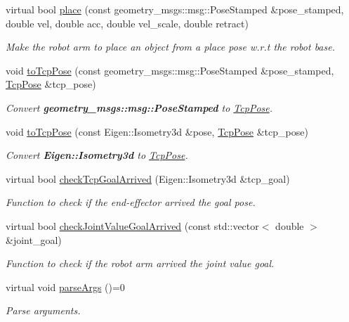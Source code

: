\begin{DoxyCompactItemize}
virtual bool \hyperlink{classArmControlBase_a3bb794da7b45bce3e2e16b3cecb21379}{place} (const geometry\+\_\+msgs\+::msg\+::\+Pose\+Stamped \&pose\+\_\+stamped, double vel, double acc, double vel\+\_\+scale, double retract)
\begin{DoxyCompactList}\small\item\em Make the robot arm to place an object from a place pose w.\+r.\+t the robot base. \end{DoxyCompactList}\item 
void \hyperlink{classArmControlBase_a5163e7091cd7d1a9a12121cfaefc6330}{to\+Tcp\+Pose} (const geometry\+\_\+msgs\+::msg\+::\+Pose\+Stamped \&pose\+\_\+stamped, \hyperlink{structTcpPose}{Tcp\+Pose} \&tcp\+\_\+pose)
\begin{DoxyCompactList}\small\item\em Convert {\bfseries geometry\+\_\+msgs\+::msg\+::\+Pose\+Stamped} to \hyperlink{structTcpPose}{Tcp\+Pose}. \end{DoxyCompactList}\item 
void \hyperlink{classArmControlBase_a559aee5d6ea56cf5fba7e61c13b3ba8f}{to\+Tcp\+Pose} (const Eigen\+::\+Isometry3d \&pose, \hyperlink{structTcpPose}{Tcp\+Pose} \&tcp\+\_\+pose)
\begin{DoxyCompactList}\small\item\em Convert {\bfseries Eigen\+::\+Isometry3d} to \hyperlink{structTcpPose}{Tcp\+Pose}. \end{DoxyCompactList}\item 
virtual bool \hyperlink{classArmControlBase_a377f3ff5a7510e24c750db4878780dc4}{check\+Tcp\+Goal\+Arrived} (Eigen\+::\+Isometry3d \&tcp\+\_\+goal)
\begin{DoxyCompactList}\small\item\em Function to check if the end-\/effector arrived the goal pose. \end{DoxyCompactList}\item 
virtual bool \hyperlink{classArmControlBase_a3e695dc1f5d026fd81860f7d9d01c53b}{check\+Joint\+Value\+Goal\+Arrived} (const std\+::vector$<$ double $>$ \&joint\+\_\+goal)
\begin{DoxyCompactList}\small\item\em Function to check if the robot arm arrived the joint value goal. \end{DoxyCompactList}\item 
virtual void \hyperlink{classArmControlBase_ad7127c4d537e4cf386e0b315c4ae7386}{parse\+Args} ()=0
\begin{DoxyCompactList}\small\item\em Parse arguments. \end{DoxyCompactList}\item 

\end{DoxyCompactItemize}
